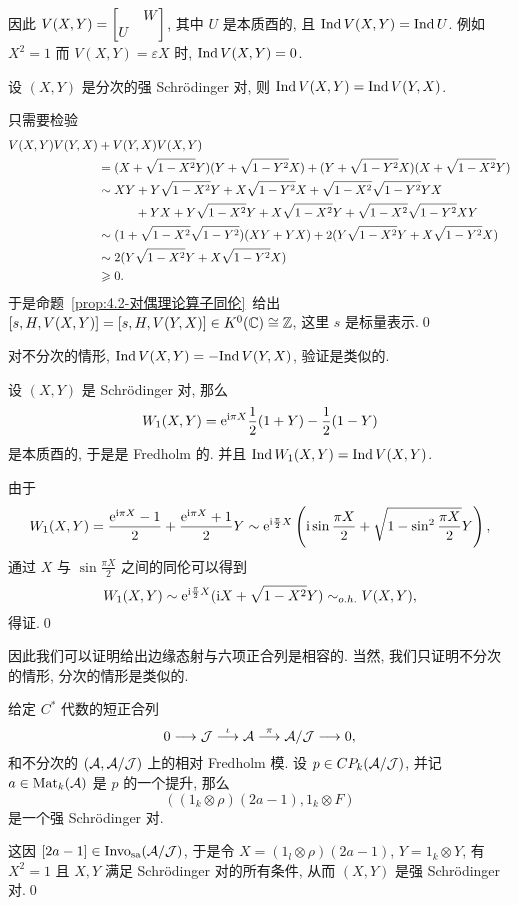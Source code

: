 因此 $ V(X,Y)=\mqty[& W \\ U &] $, 其中 $ U $ 是本质酉的, 且 $ \mathrm{Ind}\, V(X,Y)=\mathrm{Ind}\, U $. 例如 $ X^2=1 $ 而 $ V(X,Y)=\varepsilon X $ 时, $ \mathrm{Ind}\, V(X,Y)=0 $.

\begin{Proposition}
	设 $ (X,Y) $ 是分次的强 Schr\"odinger 对, 则 $ \mathrm{Ind}\, V(X,Y)=\mathrm{Ind}\, V(Y,X) $.
\end{Proposition}
\begin{Proof}
	只需要检验
	\[
		\begin{aligned}
			V(X,Y)V(Y,X)&+V(Y,X)V(X,Y)\\
			&=(X+\sqrt{1-X^2}Y)(Y+\sqrt{1-Y^2}X)+(Y+\sqrt{1-Y^2}X)(X+\sqrt{1-X^2}Y)\\
			&\sim XY+Y\sqrt{1-X^2}Y+X\sqrt{1-Y^2}X+\sqrt{1-X^2}\sqrt{1-Y^2}YX\\
			&\phantom{\sim XY}\hspace{0.25em}+YX+Y\sqrt{1-X^2}Y+X\sqrt{1-X^2}Y+\sqrt{1-X^2}\sqrt{1-Y^2}XY\\
			&\sim(1+\sqrt{1-X^2}\sqrt{1-Y^2})(XY+YX)+2(Y\sqrt{1-X^2}Y+X\sqrt{1-Y^2}X)\\
			&\sim 2(Y\sqrt{1-X^2}Y+X\sqrt{1-Y^2}X)\\
			&\geqslant 0.
		\end{aligned}
	\]
	于是命题~\ref{prop:4.2-对偶理论算子同伦}~给出 $ [s,H,V(X,Y)]=[s, H, V(Y,X)]\in K^0(\mathbb{C})\cong\mathbb{Z} $, 这里 $ s $ 是标量表示.\qed
\end{Proof}

对不分次的情形, $ \mathrm{Ind}\, V(X,Y)=-\mathrm{Ind}\, V(Y,X) $, 验证是类似的.

\begin{Lemma}
	设 $ (X,Y) $ 是 Schr\"odinger 对, 那么
	\[
		W_1(X,Y)=\mathrm{e}^{\mathrm{i}\pi X}\frac{1}{2}(1+Y)-\frac{1}{2}(1-Y)
	\]
	是本质酉的, 于是是 Fredholm 的. 并且 $ \mathrm{Ind}\, W_1(X,Y)=\mathrm{Ind}\, V(X,Y) $.
\end{Lemma}
\begin{Proof}
	由于
	\[
		W_1(X,Y)=\frac{\mathrm{e}^{\mathrm{i}\pi X}-1}{2}+\frac{\mathrm{e}^{\mathrm{i}\pi X}+1}{2}Y\sim \mathrm{e}^{\mathrm{i}\frac{\pi}{2}X}\left(\mathrm{i}\sin\frac{\pi X}{2}+\sqrt{1-\sin^2\frac{\pi X}{2}}Y\right),
	\]
	通过 $ X $ 与 $ \sin\frac{\pi X}{2} $ 之间的同伦可以得到
	\[
		W_1(X,Y)\sim\mathrm{e}^{\mathrm{i}\frac{\pi}{2}X}(\mathrm{i} X+\sqrt{1-X^2}Y)\sim_{o.h.} V(X,Y),
	\]
	得证.\qed
\end{Proof}

因此我们可以证明给出边缘态射与六项正合列是相容的. 当然, 我们只证明不分次的情形, 分次的情形是类似的.

\begin{Lemma}
	给定 $ C^* $ 代数的短正合列
	\[
		0\longrightarrow \mathcal{J}\stackrel{\iota}{\longrightarrow}\mathcal{A}\stackrel{\pi}{\longrightarrow}\mathcal{A}/\mathcal{J}\longrightarrow 0,
	\]
	和不分次的 $ (\mathcal{A},\mathcal{A}/\mathcal{J}) $ 上的相对 Fredholm 模. 设 $ p\in CP_k(\mathcal{A}/\mathcal{J}) $, 并记 $ a\in\mathrm{Mat}_k(\mathcal{A}) $ 是 $ p $ 的一个提升, 那么
	\[
		((1_k\otimes\rho)(2a-1),1_k\otimes F)
	\]
	是一个强 Schr\"odinger 对.
\end{Lemma}
\begin{Proof}
	这因 $ [2a-1]\in\text{Invo}_{\text{sa}}(\mathcal{A}/\mathcal{J}) $, 于是令 $ X=(1_l\otimes\rho)(2a-1) $, $ Y=1_k\otimes Y $, 有 $ X^2=1 $ 且 $ X, Y $ 满足 Schr\"odinger 对的所有条件, 从而 $ (X,Y) $ 是强 Schr\"odinger 对.\qed
\end{Proof}

